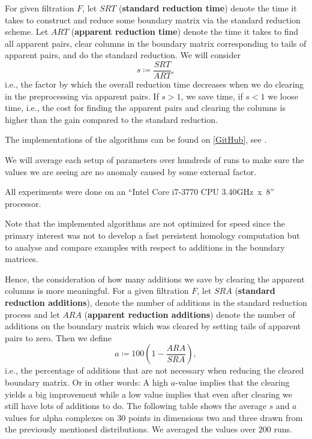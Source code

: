 For given filtration $F$, let $SRT$ (\textbf{standard reduction time}) denote the time it takes to construct and reduce some boundary matrix via the standard reduction scheme. Let $ART$ (\textbf{apparent reduction time}) denote the time it takes to find all apparent pairs, clear columns in the boundary matrix corresponding to tails of apparent pairs, and do the standard reduction. We will consider \[
s \coloneqq \frac{SRT}{ART},
\] i.e., the factor by which the overall reduction time decreases when we do clearing in the preprocessing via apparent pairs. If $s > 1$, we save time, if $s<1$ we loose time, i.e., the cost for finding the apparent pairs and clearing the columns is higher than the gain compared to the standard reduction. 

The implementations of the algorithms can be found on \href{https://github.com/IvanSpirandelli/Masterarbeit/blob/master/Algorithms/column_algo/column_algorithm.py}{[GitHub]}, see \cite{github}.

We will average each setup of parameters over hundreds of runs to make sure the values we are seeing are no anomaly caused by some external factor.

All experiments were done on an \enquote{Intel Core i7-3770 CPU \@ 3.40GHz~x~8} processor. 

Note that the implemented algorithms are not optimized for speed since the primary interest was not to develop a fast persistent homology computation but to analyse and compare examples with respect to additions in the boundary matrices. 

Hence, the consideration of how many additions we save by clearing the apparent columns is more meaningful. For a given filtration $F$, let $SRA$ (\textbf{standard reduction additions}), denote the number of additions in the standard reduction process and let $ARA$ (\textbf{apparent reduction additions}) denote the number of additions on the boundary matrix which was cleared by setting tails of apparent pairs to zero. Then we define
\[
a \coloneqq 100 (1- \frac{ARA}{SRA}),
\]
i.e., the percentage of additions that are not necessary when reducing the cleared boundary matrix. Or in other words: A high $a$-value implies that the clearing yields a big improvement while a low value implies that even after clearing we still have lots of additions to do. The following table shows the average $s$ and $a$ values for alpha complexes on $30$ points in dimensions two and three drawn from the previously mentioned distributions. We averaged the values over $200$ runs.



